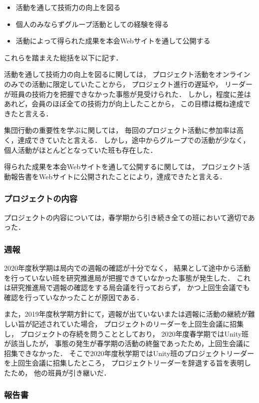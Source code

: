 \begin{itemize}
\item 活動を通して技術力の向上を図る
\item 個人のみならずグループ活動としての経験を得る
\item 活動によって得られた成果を本会Webサイトを通して公開する
\end{itemize}

これらを踏まえた総括を以下に記す．

活動を通して技術力の向上を図るに関しては，
プロジェクト活動をオンラインのみでの活動に限定していたことから，
プロジェクト進行の遅延や，
リーダーが班員の技術力を把握できなかった事態が見受けられた．
しかし，程度に差はあれど，会員のほぼ全ての技術力が向上したことから，
この目標は概ね達成できたと言える．

集団行動の重要性を学ぶに関しては，
毎回のプロジェクト活動に参加率は高く，達成できていたと言える．
しかし，途中からグループでの活動が少なく，個人活動がほとんどとなっていた班も存在した．

得られた成果を本会Webサイトを通して公開するに関しては，
プロジェクト活動報告書をWebサイトに公開されたことにより，達成できたと言える．

\subsubsection*{プロジェクトの内容}
プロジェクトの内容については，春学期から引き続き全ての班において適切であった．

\subsubsection*{週報}
2020年度秋学期は局内での週報の確認が十分でなく，
結果として途中から活動を行っていない班を研究推進局が把握できていなかった事態が発生した．
これは研究推進局で週報の確認をする局会議を行っておらず，
かつ上回生会議でも確認を行っていなかったことが原因である．

また，2019年度秋学期方針にて，週報が出ていないまたは週報に活動の継続が難しい旨が記述されていた場合，
プロジェクトのリーダーを上回生会議に招集し，
プロジェクトの存続を問うこととしており，
2020年度春学期ではUnity班が該当したが，
事態の発生が春学期の活動の終盤であったため，上回生会議に招集できなかった．
そこで2020年度秋学期ではUnity班のプロジェクトリーダーを上回生会議に招集したところ，
プロジェクトリーダーを辞退する旨を表明したため，
他の班員が引き継いだ．

\subsubsection*{報告書}

